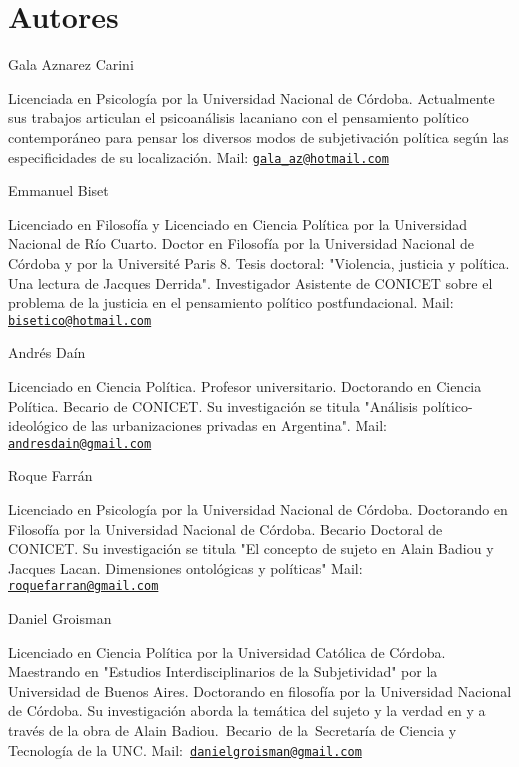 \documentclass{book}
\begin{document}
\chapter{Autores}

Gala Aznarez Carini

Licenciada en Psicología por la Universidad Nacional de Córdoba.
Actualmente sus trabajos articulan el psicoanálisis lacaniano con el
pensamiento político contemporáneo para pensar los diversos modos de
subjetivación política según las especificidades de su localización.
Mail:
\href{mailto:gala_az@hotmail.com}{\nolinkurl{gala\_az@hotmail.com}}

Emmanuel Biset

Licenciado en Filosofía y Licenciado en Ciencia Política por la
Universidad Nacional de Río Cuarto. Doctor en Filosofía por la
Universidad Nacional de Córdoba y por la Université Paris 8. Tesis
doctoral: "Violencia, justicia y política. Una lectura de Jacques
Derrida". Investigador Asistente de CONICET sobre el problema de la
justicia en el pensamiento político postfundacional. Mail:
\href{mailto:bisetico@hotmail.com}{\nolinkurl{bisetico@hotmail.com}}

Andrés Daín

Licenciado en Ciencia Política. Profesor universitario. Doctorando en
Ciencia Política. Becario de CONICET. Su investigación se titula
"Análisis político-ideológico de las urbanizaciones privadas en
Argentina". Mail:
\href{mailto:andresdain@gmail.com}{\nolinkurl{andresdain@gmail.com}}

Roque Farrán

Licenciado en Psicología por la Universidad Nacional de Córdoba.
Doctorando en Filosofía por la Universidad Nacional de Córdoba. Becario
Doctoral de CONICET. Su investigación se titula "El concepto de sujeto
en Alain Badiou y Jacques Lacan. Dimensiones ontológicas y políticas"
Mail:
\href{mailto:roquefarran@gmail.com}{\nolinkurl{roquefarran@gmail.com}}

Daniel Groisman

Licenciado en Ciencia Política por la Universidad Católica de Córdoba.
Maestrando en "Estudios Interdisciplinarios de la Subjetividad" por la
Universidad de Buenos Aires. Doctorando en filosofía por la Universidad
Nacional de Córdoba. Su investigación aborda la temática del sujeto y la
verdad en y a través de la obra de Alain Badiou.~Becario~de
la~Secretaría de Ciencia y Tecnología de la UNC.
Mail:~\href{mailto:danielgroisman@gmail.com}{\nolinkurl{danielgroisman@gmail.com}}
\end{document}
